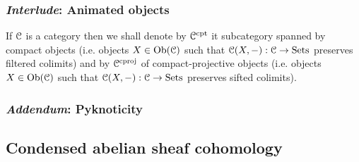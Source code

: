         \subsubsection{\textit{Interlude}: Animated objects}
            \begin{convention}
                If $\mathcal{C}$ is a category then we shall denote by $\mathcal{C}^{\mathrm{cpt}}$ it subcategory spanned by compact objects (i.e. objects $X \in \mathrm{Ob}(\mathcal{C})$ such that $\mathcal{C}(X, -): \mathcal{C} \to \mathrm{Sets}$ preserves filtered colimits) and by $\mathcal{C}^{\mathrm{cproj}}$ of compact-projective objects (i.e. objects $X \in \mathrm{Ob}(\mathcal{C})$ such that $\mathcal{C}(X, -): \mathcal{C} \to \mathrm{Sets}$ preserves sifted colimits).
            \end{convention}
            \begin{definition} \label{def: animated_obejcts}
                
            \end{definition}
            
        \subsubsection{\textit{Addendum}: Pyknoticity}
            
    \subsection{Condensed abelian sheaf cohomology}
